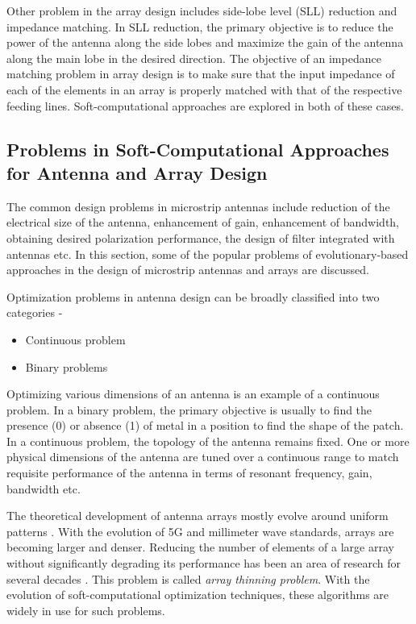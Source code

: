 Other problem in the array design includes side-lobe level (SLL) reduction and impedance matching. In SLL reduction, the primary objective is to reduce the power of the antenna along the side lobes and maximize the gain of the antenna along the main lobe in the desired direction. The objective of an impedance matching problem in array design is to make sure that the input impedance of each of the elements in an array is properly matched with that of the respective feeding lines. Soft-computational approaches are explored in both of these cases.

\subsection{Problems in Soft-Computational Approaches for Antenna and Array Design}
The common design problems in microstrip antennas include reduction of the electrical size of the antenna, enhancement of gain, enhancement of bandwidth, obtaining desired polarization performance, the design of filter integrated with antennas etc. In this section, some of the popular problems of evolutionary-based approaches in the design of microstrip antennas and arrays are discussed.

Optimization problems in antenna design can be broadly classified into two categories -
\begin{itemize}
\item Continuous problem
\item Binary problems
\end{itemize}

Optimizing various dimensions of an antenna is an example of a continuous problem. In a binary problem, the primary objective is usually to find the presence (0) or absence (1) of metal in a position to find the shape of the patch. In a continuous problem, the topology of the antenna remains fixed. One or more physical dimensions of the antenna are tuned over a continuous range to match requisite performance of the antenna in terms of resonant frequency, gain, bandwidth etc.

The theoretical development of antenna arrays mostly evolve around uniform patterns \cite{classicTheory, phasedArrayHandbook}. With the evolution of 5G and millimeter wave standards, arrays are becoming larger and denser. Reducing the number of elements of a large array without significantly degrading its performance has been an area of research for several decades \cite{thinnedArrayBook}. This problem is called \emph{array thinning problem}. With the evolution of soft-computational optimization techniques, these algorithms are widely in use for such problems.

